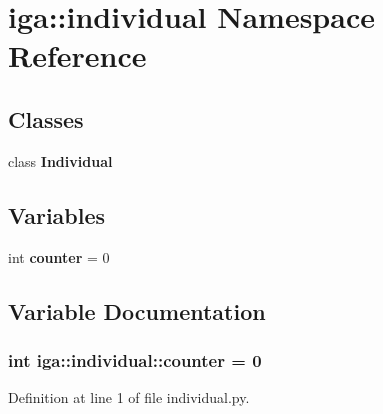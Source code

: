 \section{iga::individual Namespace Reference}
\label{namespaceiga_1_1individual}


\subsection*{Classes}
\begin{CompactItemize}
\item 
class {\bf Individual}
\end{CompactItemize}
\subsection*{Variables}
\begin{CompactItemize}
\item 
int {\bf counter} = 0
\end{CompactItemize}


\subsection{Variable Documentation}
\subsubsection{\setlength{\rightskip}{0pt plus 5cm}int {\bf iga::individual::counter} = 0\hspace{0.3cm}{\tt  [static]}}\label{namespaceiga_1_1individual_7b401e7e1ad89ae1d8f7203925c045a1}




Definition at line 1 of file individual.py.